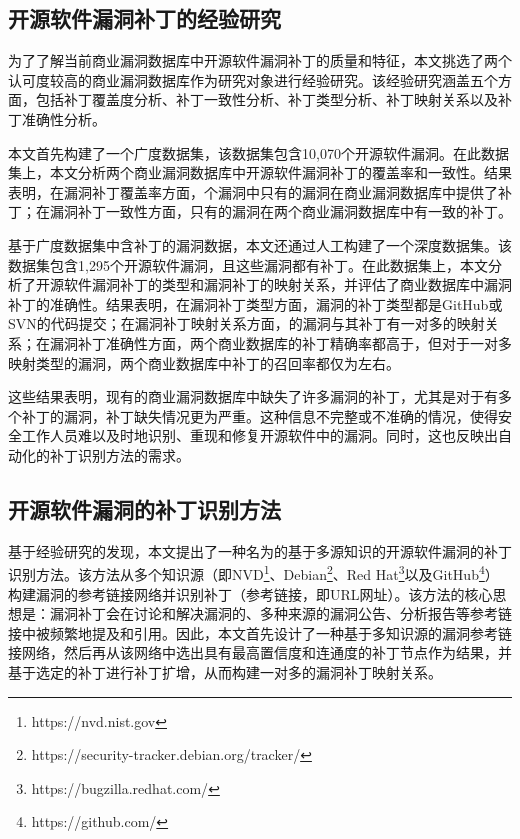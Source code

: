 \subsection{开源软件漏洞补丁的经验研究}
为了了解当前商业漏洞数据库中开源软件漏洞补丁的质量和特征，本文挑选了两个认可度较高的商业漏洞数据库作为研究对象进行经验研究。该经验研究涵盖五个方面，包括补丁覆盖度分析、补丁一致性分析、补丁类型分析、补丁映射关系以及补丁准确性分析。

本文首先构建了一个广度数据集，该数据集包含10,070个开源软件漏洞。在此数据集上，本文分析两个商业漏洞数据库中开源软件漏洞补丁的覆盖率和一致性。结果表明，在漏洞补丁覆盖率方面，个漏洞中只有的漏洞在商业漏洞数据库中提供了补丁；在漏洞补丁一致性方面，只有的漏洞在两个商业漏洞数据库中有一致的补丁。%

基于广度数据集中含补丁的漏洞数据，本文还通过人工构建了一个深度数据集。该数据集包含1,295个开源软件漏洞，且这些漏洞都有补丁。在此数据集上，本文分析了开源软件漏洞补丁的类型和漏洞补丁的映射关系，并评估了商业数据库中漏洞补丁的准确性。结果表明，在漏洞补丁类型方面，漏洞的补丁类型都是GitHub或SVN的代码提交；在漏洞补丁映射关系方面，的漏洞与其补丁有一对多的映射关系；在漏洞补丁准确性方面，两个商业数据库的补丁精确率都高于，但对于一对多映射类型的漏洞，两个商业数据库中补丁的召回率都仅为左右。

这些结果表明，现有的商业漏洞数据库中缺失了许多漏洞的补丁，尤其是对于有多个补丁的漏洞，补丁缺失情况更为严重。这种信息不完整或不准确的情况，使得安全工作人员难以及时地识别、重现和修复开源软件中的漏洞。同时，这也反映出自动化的补丁识别方法的需求。

\subsection{开源软件漏洞的补丁识别方法}
基于经验研究的发现，本文提出了一种名为\tool 的基于多源知识的开源软件漏洞的补丁识别方法。该方法从多个知识源（即NVD\footnote{https://nvd.nist.gov}、Debian\footnote{https://security-tracker.debian.org/tracker/}、Red Hat\footnote{https://bugzilla.redhat.com/}以及GitHub\footnote{https://github.com/}）构建漏洞的参考链接网络并识别补丁（参考链接，即URL网址）。该方法的核心思想是：漏洞补丁会在讨论和解决漏洞的、多种来源的漏洞公告、分析报告等参考链接中被频繁地提及和引用。因此，本文首先设计了一种基于多知识源的漏洞参考链接网络，然后再从该网络中选出具有最高置信度和连通度的补丁节点作为结果，并基于选定的补丁进行补丁扩增，从而构建一对多的漏洞补丁映射关系。

